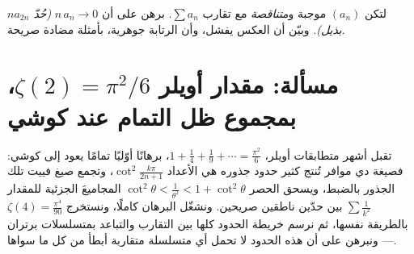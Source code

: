 \begin{exercise}[$\star\star\star$]\label{exo:b2:series:12}
لتكن $(a_n)$ موجبة و\emph{متناقصة} مع تقارب $\sum a_n$.
برهن على أن $n\,a_n \to 0$ \emph{(حُدّ $n a_{2n}$ بذيل)}. وبيّن أن العكس يفشل، وأن الرتابة
جوهرية، بأمثلة مضادة صريحة.
\end{exercise}

\section{مسألة: مقدار أويلر $\zeta(2) = \pi^2/6$، بمجموع ظل التمام عند كوشي}

تقبل أشهر متطابقات أويلر، $1 + \frac14 + \frac19 + \cdots =
\frac{\pi^2}6$، برهانًا أوّليًا تمامًا يعود
إلى كوشي: فصيغة دي موافر تُنتج كثير حدود جذوره
هي الأعداد $\cot^2\frac{k\pi}{2n+1}$، وتجمع صيغ فييت تلك الجذور
بالضبط، ويسحق الحصر $\cot^2\theta < \frac{1}{\theta^2} <
1 + \cot^2\theta$ المجاميعَ الجزئية للمقدار $\sum\frac1{k^2}$
بين حدّين ناطقين صريحين. ونشغّل البرهان كاملًا،
ونستخرج $\zeta(4) = \frac{\pi^4}{90}$ بالطريقة نفسها، ثم
نرسم خريطة الحدود كلها بين التقارب والتباعد بمتسلسلات
برتران --- ونبرهن على أن هذه الحدود لا تحمل أي متسلسلة
متقاربة أبطأ من كل ما سواها.


